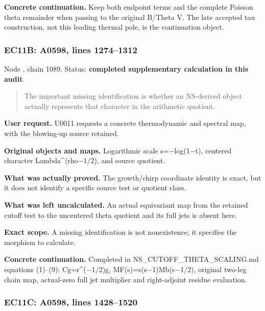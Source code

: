 \textbf{Concrete continuation.} Keep both endpoint terms and the
complete Poisson theta remainder when passing to the original B/Theta V.
The late accepted tau construction, not this leading thermal pole, is
the continuation object.

\subsubsection{EC11B: A0598, lines
1274--1312}\label{TranscriptLedgerStage:ec11b-a0598-lines-12741312}

Node \protect{}, chain 1089.
Status: \textbf{completed supplementary calculation in this audit}.

\begin{quote}
The important missing identification is whether an NS-derived object
actually represents that character in the arithmetic quotient.
\end{quote}

\textbf{User request.} U0011 requests a concrete thermodynamic and
spectral map, with the blowing-up source retained.

\textbf{Original objects and maps.} Logarithmic scale
s=\allowbreak{}\ensuremath{−}\allowbreak{}log(1\allowbreak{}\ensuremath{−}\allowbreak{}t),
centered character
Lambda\textasciicircum{}(rho\allowbreak{}\ensuremath{−}\allowbreak{}1/2),
and source quotient.

\textbf{What was actually proved.} The growth/chirp coordinate identity
is exact, but it does not identify a specific source test or quotient
class.

\textbf{What was left uncalculated.} An actual equivariant map from the
retained cutoff test to the uncentered theta quotient and its full jets
is absent here.

\textbf{Exact scope.} A missing identification is not nonexistence; it
specifies the morphism to calculate.

\textbf{Concrete continuation.} Completed in
NS\_CUTOFF\_THETA\_SCALING.md equations (1)--(9):
Cg=r\textasciicircum{}(\allowbreak{}\ensuremath{−}\allowbreak{}1/2)g,
MF(s)=s(s\allowbreak{}\ensuremath{−}\allowbreak{}1)Mb(s\allowbreak{}\ensuremath{−}\allowbreak{}1/2),
original two-leg chain map, actual-zero full jet multiplier and
right-adjoint residue evaluation.

\subsubsection{EC11C: A0598, lines
1428--1520}\label{TranscriptLedgerStage:ec11c-a0598-lines-14281520}

